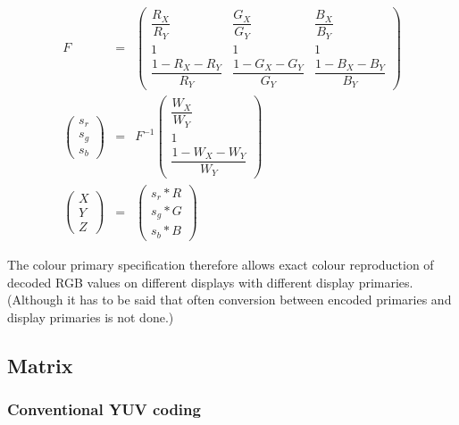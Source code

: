 \begin{informative*}
\begin{eqnarray*}
F & = &
\left(
    \begin{array}{ccc}
    \dfrac{R_X}{R_Y} & \dfrac{G_X}{G_Y} & \dfrac{B_X}{B_Y} \\
    1 & 1 & 1 \\
    \dfrac{1-R_X-R_Y}{R_Y} & \dfrac{1-G_X-G_Y}{G_Y} & \dfrac{1-B_X-B_Y}{B_Y}
    \end{array}
\right)
\\
\left(
    \begin{array}{c}
    s_r \\
    s_g \\
    s_b
    \end{array}
\right ) & = & F^{-1}
\left(
    \begin{array}{c}
    \dfrac{W_X}{W_Y} \\
    1 \\
    \dfrac{1-W_X-W_Y}{W_Y}
    \end{array}
\right) 
\\
\left(
    \begin{array}{c}
    X \\
    Y \\
    Z
    \end{array}
\right) & = & 
\left(
    \begin{array}{c}
    s_r*R \\
    s_g*G \\
    s_b*B
    \end{array}
\right)
\end{eqnarray*}

The colour primary specification therefore allows exact colour
reproduction of decoded RGB values on different displays with different
display primaries. (Although it has to be said that often conversion between
encoded primaries and display primaries is not done.)

\subsection{Matrix}
\label{matrix}
\subsubsection{Conventional YUV coding}


\end{informative*}
